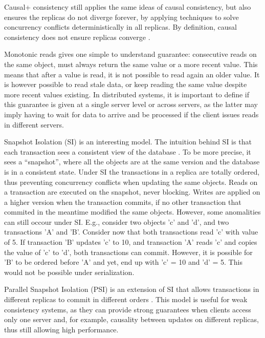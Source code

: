 Causal+ consistency \cite{cops} still applies the same ideas of causal consistency, but also ensures the replicas do not diverge forever, by applying techniques to solve concurrency conflicts deterministically in all replicas.
By definition, causal consistency does not ensure replicas converge \cite{cops}.

Monotonic reads \cite{session, understandingEC} gives one simple to understand guarantee: consecutive reads on the same object, must always return the same value or a more recent value.
This means that after a value is read, it is not possible to read again an older value.
It is however possible to read stale data, or keep reading the same value despite more recent values existing.
In distributed systems, it is important to define if this guarantee is given at a single server level or across servers, as the latter may imply having to wait for data to arrive and be processed if the client issues reads in different servers.

Snapshot Isolation (SI) is an interesting model.
The intuition behind SI is that each transaction sees a consistent view of the database \cite{si}.
To be more precise, it sees a ``snapshot'', where all the objects are at the same version and the database is in a consistent state.
Under SI the transactions in a replica are totally ordered, thus preventing concurrency conflicts when updating the same objects.
Reads on a transaction are executed on the snapshot, never blocking.
Writes are applied on a higher version when the transaction commits, if no other transaction that commited in the meantime modified the same objects.
However, some anomalities can still occour under SI.
E.g., consider two objects 'c' and 'd', and two transactions 'A' and 'B'.
Consider now that both transactions read 'c' with value of 5. 
If transaction 'B' updates 'c' to 10, and transaction 'A' reads 'c' and copies the value of 'c' to 'd', both transactions can commit.
However, it is possible for 'B' to be ordered before 'A' and yet, end up with 'c' = 10 and 'd' = 5.
This would not be possible under serialization.

Parallel Snapshot Isolation (PSI) is an extension of SI that allows transactions in different replicas to commit in different orders \cite{walter}.
This model is useful for weak consistency systems, as they can provide strong guarantees when clients access only one server and, for example, causality between updates on different replicas, thus still allowing high performance. 

